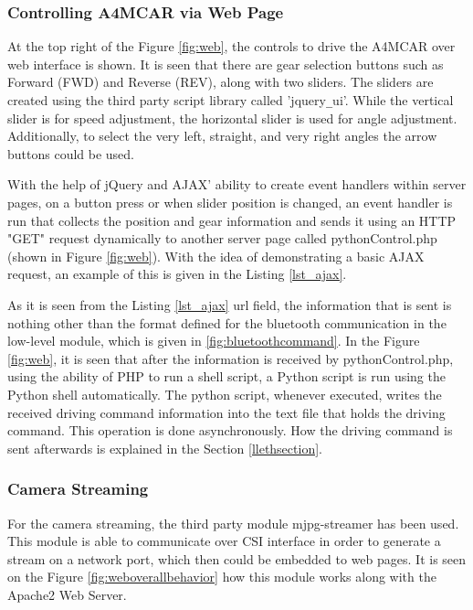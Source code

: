 \subsubsection{Controlling A4MCAR via Web Page}
At the top right of the Figure \ref{fig:web}, the controls to drive the A4MCAR over web interface is shown. It is seen that there are gear selection buttons such as Forward (FWD) and Reverse (REV), along with two sliders. The sliders are created using the third party script library called 'jquery\texttt{\_}ui'. While the vertical slider is for speed adjustment, the horizontal slider is used for angle adjustment. Additionally, to select the very left, straight, and very right angles the arrow buttons could be used. 

With the help of jQuery and AJAX' ability to create event handlers within server pages, on a button press or when slider position is changed, an event handler is run that collects the position and gear information and sends it using an HTTP "GET" request dynamically to another server page called pythonControl.php (shown in Figure \ref{fig:web}). With the idea of demonstrating a basic AJAX request, an example of this is given in the Listing \ref{lst_ajax}.



As it is seen from the Listing \ref{lst_ajax} url field, the information that is sent is nothing other than the format defined for the bluetooth communication in the low-level module, which is given in \ref{fig:bluetoothcommand}. In the Figure \ref{fig:web}, it is seen that after the information is received by pythonControl.php, using the ability of PHP to run a shell script, a Python script is run using the Python shell automatically. The python script, whenever executed, writes the received driving command information into the text file that holds the driving command. This operation is done asynchronously. How the driving command is sent afterwards is explained in the Section \ref{llethsection}.
\subsubsection{Camera Streaming}
For the camera streaming, the third party module mjpg-streamer \cite{mjpgstreamergithub} has been used. This module is able to communicate over CSI interface in order to generate a stream on a network port, which then could be embedded to web pages. It is seen on the Figure \ref{fig:weboverallbehavior} how this module works along with the Apache2 Web Server. 


